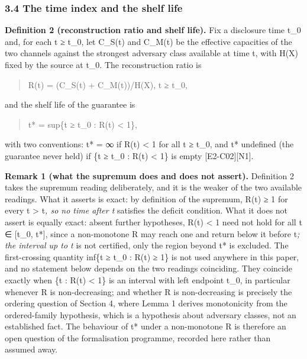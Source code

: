 \documentclass[
  11pt,
]{article}
\begin{document}
\subsubsection{3.4 The time index and the shelf
life}\label{the-time-index-and-the-shelf-life}

\textbf{Definition 2 (reconstruction ratio and shelf life).} Fix a
disclosure time t\_0 and, for each t ≥ t\_0, let C\_S(t) and C\_M(t) be
the effective capacities of the two channels against the strongest
adversary class available at time t, with H(X) fixed by the source at
t\_0. The reconstruction ratio is

\begin{quote}
R(t) = (C\_S(t) + C\_M(t))/H(X), t ≥ t\_0,
\end{quote}

and the shelf life of the guarantee is

\begin{quote}
t* = sup\{t ≥ t\_0 : R(t) \textless{} 1\},
\end{quote}

with two conventions: t* = ∞ if R(t) \textless{} 1 for all t ≥ t\_0, and
t* undefined (the guarantee never held) if \{t ≥ t\_0 : R(t) \textless{}
1\} is empty {[}E2-C02{]}{[}N1{]}.

\textbf{Remark 1 (what the supremum does and does not assert).}
Definition 2 takes the supremum reading deliberately, and it is the
weaker of the two available readings. What it asserts is exact: by
definition of the supremum, R(t) ≥ 1 for every t \textgreater{} t\emph{,
so no time after t} satisfies the deficit condition. What it does not
assert is equally exact: absent further hypotheses, R(t) \textless{} 1
need not hold for all t ∈ {[}t\_0, t*{]}, since a non-monotone R may
reach one and return below it before t\emph{; the interval up to t} is
not certified, only the region beyond t* is excluded. The first-crossing
quantity inf\{t ≥ t\_0 : R(t) ≥ 1\} is not used anywhere in this paper,
and no statement below depends on the two readings coinciding. They
coincide exactly when \{t : R(t) \textless{} 1\} is an interval with
left endpoint t\_0, in particular whenever R is non-decreasing; and
whether R is non-decreasing is precisely the ordering question of
Section 4, where Lemma 1 derives monotonicity from the ordered-family
hypothesis, which is a hypothesis about adversary classes, not an
established fact. The behaviour of t* under a non-monotone R is
therefore an open question of the formalisation programme, recorded here
rather than assumed away.
\end{document}
